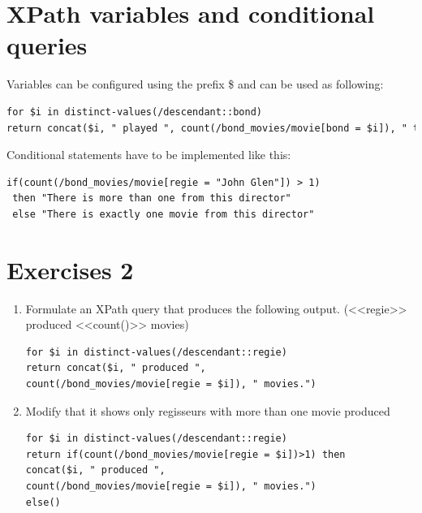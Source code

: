 \section{XPath variables and conditional queries}
Variables can be configured using the prefix \$ and can be used as following:
\begin{lstlisting}[language=XML]
for $i in distinct-values(/descendant::bond)
return concat($i, " played ", count(/bond_movies/movie[bond = $i]), " times.")
\end{lstlisting}

Conditional statements have to be implemented like this:
\begin{lstlisting}[language=XML]
if(count(/bond_movies/movie[regie = "John Glen"]) > 1)
 then "There is more than one from this director"
 else "There is exactly one movie from this director"
\end{lstlisting}


\section{Exercises 2}
\begin{enumerate}
\item Formulate an XPath query that produces the following output. (<<regie>> produced <<count()>> movies)
\begin{lstlisting}[language=XML]
for $i in distinct-values(/descendant::regie)
return concat($i, " produced ",
count(/bond_movies/movie[regie = $i]), " movies.")
\end{lstlisting}

\item Modify that it shows only regisseurs with more than one movie produced
\begin{lstlisting}[language=XML]
for $i in distinct-values(/descendant::regie)
return if(count(/bond_movies/movie[regie = $i])>1) then
concat($i, " produced ",
count(/bond_movies/movie[regie = $i]), " movies.")
else()
\end{lstlisting}
\end{enumerate}

